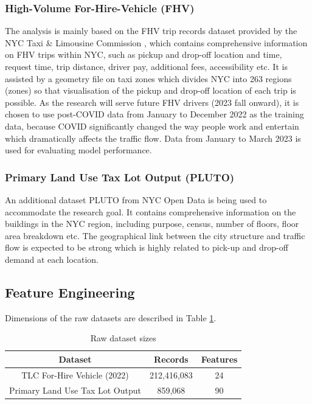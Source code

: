 \documentclass[11pt]{article}
\begin{document}
\subsubsection{High-Volume For-Hire-Vehicle (FHV)}
The analysis is mainly based on the FHV trip records dataset provided by the NYC Taxi \& Limousine Commission \cite{NYCTLC}, which contains comprehensive information on FHV trips within NYC, such as pickup and drop-off location and time, request time, trip distance, driver pay, additional fees, accessibility etc. It is assisted by a geometry file on taxi zones which divides NYC into 263 regions (zones) so that visualisation of the pickup and drop-off location of each trip is possible. As the research will serve future FHV drivers (2023 fall onward), it is chosen to use post-COVID data from January to December 2022 as the training data, because COVID significantly changed the way people work and entertain which dramatically affects the traffic flow. Data from January to March 2023 is used for evaluating model performance.  

\subsubsection{Primary Land Use Tax Lot Output (PLUTO)}
An additional dataset PLUTO from NYC Open Data \cite{nycPLUTO} is being used to accommodate the research goal. It contains comprehensive information on the buildings in the NYC region, including purpose, census, number of floors, floor area breakdown etc. The geographical link between the city structure and traffic flow is expected to be strong which is highly related to pick-up and drop-off demand at each location. 


\subsection{Feature Engineering}
Dimensions of the raw datasets are described in Table \ref{dataset size}. 
\begin{table}[h!]
\centering
    \begin{tabular} {|c||c|c|}
    \hline
    \textbf{Dataset} & \textbf{Records} & \textbf{Features} \\
    \hline
    TLC For-Hire Vehicle (2022) & 212,416,083 & 24 \\
    \hline
    Primary Land Use Tax Lot Output & 859,068 & 90 \\
    \hline
    \end{tabular}
    \caption{Raw dataset sizes}
    \label{dataset size}
\end{table}
\end{document}
